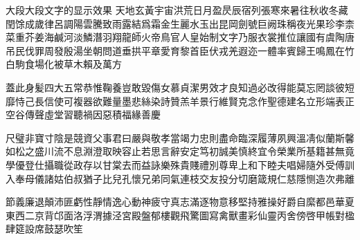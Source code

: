 \documentclass[xcolor=table,mathserif]{beamer}
\begin{document}
\begin{frame}[allowframebreaks]{大段大段文字的显示效果}
天地玄黃\enspace 宇宙洪荒\enspace 日月盈昃\enspace 辰宿列張\enspace 寒來暑往\enspace 秋收冬藏\enspace 閏馀成歲\enspace 律呂調陽\enspace 雲騰致雨\enspace 露結爲霜\enspace 金生麗水\enspace 玉出昆岡\enspace 劍號巨阙\enspace 珠稱夜光\enspace 果珍李柰\enspace 菜重芥姜\enspace 海鹹河淡\enspace 鱗潛羽翔\enspace 龍師火帝\enspace 鳥官人皇\enspace 始制文字\enspace 乃服衣裳\enspace 推位讓國\enspace 有虞陶唐\enspace 吊民伐罪\enspace 周發殷湯\enspace 坐朝問道\enspace 垂拱平章\enspace 愛育黎首\enspace 臣伏戎羌\enspace 遐迩一體\enspace 率賓歸王\enspace 鳴鳳在竹\enspace 白駒食場\enspace 化被草木\enspace 賴及萬方\enspace 

蓋此身髪\enspace 四大五常\enspace 恭惟鞠養\enspace 豈敢毀傷\enspace 女慕貞潔\enspace 男效才良\enspace 知過必改\enspace 得能莫忘\enspace 罔談彼短\enspace 靡恃己長\enspace 信使可複\enspace 器欲難量\enspace 墨悲絲染\enspace 詩贊羔羊\enspace 景行維賢\enspace 克念作聖\enspace 德建名立\enspace 形端表正\enspace 空谷傳聲\enspace 虛堂習聽\enspace 禍因惡積\enspace 福緣善慶\enspace 

尺璧非寶\enspace 寸陰是競\enspace 資父事君\enspace 曰嚴與敬\enspace 孝當竭力\enspace 忠則盡命\enspace 臨深履薄\enspace 夙興溫凊\enspace 似蘭斯馨\enspace 如松之盛\enspace 川流不息\enspace 淵澄取映\enspace 容止若思\enspace 言辭安定\enspace 笃初誠美\enspace 慎終宜令\enspace 榮業所基\enspace 籍甚無竟\enspace 學優登仕\enspace 攝職從政\enspace 存以甘棠\enspace 去而益詠\enspace 樂殊貴賤\enspace 禮別尊卑\enspace 上和下睦\enspace 夫唱婦隨\enspace 外受傅訓\enspace 入奉母儀\enspace 諸姑伯叔\enspace 猶子比兒\enspace 孔懷兄弟\enspace 同氣連枝\enspace 交友投分\enspace 切磨箴規\enspace 仁慈隱恻\enspace 造次弗離\enspace 

節義廉退\enspace 顛沛匪虧\enspace 性靜情逸\enspace 心動神疲\enspace 守真志滿\enspace 逐物意移\enspace 堅持雅操\enspace 好爵自縻\enspace 都邑華夏\enspace 東西二京\enspace 背邙面洛\enspace 浮渭據泾\enspace 宮殿盤郁\enspace 樓觀飛驚\enspace 圖寫禽獸\enspace 畫彩仙靈\enspace 丙舍傍啓\enspace 甲帳對楹\enspace 肆筵設席\enspace 鼓瑟吹笙\enspace 


\end{frame}
\end{document}
